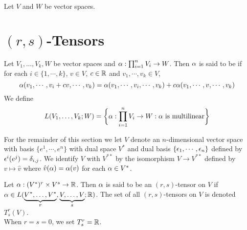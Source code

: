 \documentclass{book}
\begin{document}
	Let $V$ and $W$ be vector spaces. 
	
	
	
	
	
	
	
	
	
	
	
	
	
	
	
	
	
	
	
	
	
	
	
	
	
	
	
	
	
	
	
	
	
	
	
	
	
	
	
	
	
	
	
	
	
	
	
	
	
	
	
	
	
	
	\section{$(r,s)$-Tensors}
	
	\begin{defn}
	Let $V_1, \dots, V_k, W$ be vector spaces and $\alpha : \prod_{i=1}^n V_i \rightarrow W$. Then $\alpha$ is said to be  if for each $i \in \{1, \cdots, k\}$, $v \in V$, $c \in \mathbb{R}$ and $v_1, \cdots, v_k \in V$, $$\alpha(v_1, \cdots, v_i + cv, \cdots, v_k) = \alpha(v_1, \cdots, v_i, \cdots, v_k) + c\alpha(v_1, \cdots, v, \cdots, v_k)$$
	We define $$L(V_1, \dots, V_k; W) = \bigg \{\alpha : \prod_{i=1}^n V_i \rightarrow W: \alpha \text{ is multilinear} \bigg\}$$ 
	\end{defn}	
	
	\begin{note}
		For the remainder of this section we let $V$ denote an $n$-dimensional vector space with basis $\{e^1, \cdots, e^n\}$ with dual space $V^*$ and dual basis $\{\epsilon_1, \cdots, \epsilon_n\}$ defined by $\epsilon^i(e^j) = \delta_{i,j}$. We identify $V$ with $V^{**}$ by the isomorphism $V \rightarrow V^{**}$ defined by $v \mapsto \hat{v}$ where $\hat{v}(\alpha) = \alpha(v)$ for each $\alpha \in V^*$. 
	\end{note}	
	
	\begin{defn}
	Let $\alpha: (V^*)^r \times V^s \rightarrow \mathbb{R}$. Then $\alpha$ is said to be an $(r,s)$-tensor on $V$ if $\alpha \in L(\underbrace{V^*, \dots, V^*}_{r}, \underbrace{V, \dots, V}_{s}; \mathbb{R})$. The set of all $(r,s)$-tensors on $V$ is denoted $T^r_s(V)$. \\
	When $r=s=0$, we set $T^r_s = \mathbb{R}$.
	\end{defn}
	
\end{document}
